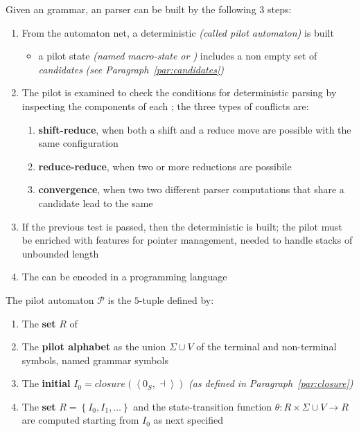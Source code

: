 \documentclass[english]{article}
\begin{document}
Given an \EBNF grammar, an \elro parser can be built by the following \(3\) steps:

\begin{enumerate}
  \item From the automaton net, a deterministic \FSA \textit{(called pilot automaton)} is built
        \begin{itemize}
          \item a pilot state \textit{(named macro-state or \mstate)} includes a non empty set of \textit{candidates} \textit{(see Paragraph~\ref{par:candidates})}
        \end{itemize}
  \item The pilot is examined to check the conditions for deterministic parsing by inspecting the components of each \mstate; the three types of conflicts are:
        \begin{enumerate}
          \item \textbf{shift-reduce}, when both a shift and a reduce move are possible with the same configuration
          \item \textbf{reduce-reduce}, when two or more reductions are possibile
          \item \textbf{convergence}, when two two different parser computations that share a candidate lead to the same \mstate
        \end{enumerate}
  \item If the previous test is passed, then the deterministic \PDA is built; the pilot \FSA must be enriched with features for pointer management, needed to handle stacks of unbounded length
  \item The \PDA can be encoded in a programming language
\end{enumerate}

\bigskip
The pilot automaton \(\mathcal{P}\) is the \(5\)-tuple defined by:

\begin{enumerate}
  \item The \textbf{set} \(R\) of \mstates
  \item The \textbf{pilot alphabet} as the union \(\Sigma \cup V\) of the terminal and non-terminal symbols, named grammar symbols
  \item The \textbf{initial \mstate} \(I_0 = \textit{closure}\left( \left\langle 0_S, \dashv \right\rangle \right)\) \textit{(as defined in Paragraph~\ref{par:closure})}
  \item The \textbf{\mstate set} \(R = \left\{ I_0, I_1, \ldots \right\}\) and the state-transition function \(\theta: R \times \Sigma \cup V \rightarrow R\) are computed starting from \(I_0\) as next specified
\end{enumerate}
\end{document}

